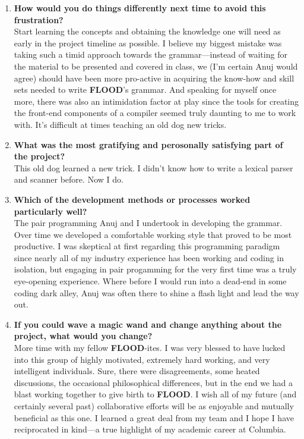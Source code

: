 \documentclass[12pt]{report}
\begin{document}
\begin{enumerate}
\item \textbf{How would you do things differently next time to avoid this frustration?}\\
Start learning the concepts and obtaining the knowledge one will need as early in the project timeline as possible. I believe my biggest mistake was taking such a timid approach towards the grammar---instead of waiting for the material to be presented and covered in class, we (I'm certain Anuj would agree) should have been more pro-active in acquiring the know-how and skill sets needed to write \textbf{FLOOD}'s grammar. And speaking for myself once more, there was also an intimidation factor at play since the tools for creating the front-end components of a compiler seemed truly daunting to me to work with. It's difficult at times teaching an old dog new tricks.
\item \textbf{What was the most gratifying and perosonally satisfying part of the project?}\\
This old dog learned a new trick. I didn't know how to write a lexical parser and scanner before. Now I do.
\item \textbf{Which of the development methods or processes worked particularly well?}\\
The pair programming Anuj and I undertook in developing the grammar. Over time we developed a comfortable working style that proved to be most productive. I was skeptical at first regarding this programming paradigm since nearly all of my industry experience has been working and coding in isolation, but engaging in pair progamming for the very first time was a truly eye-opening experience. Where before I would run into a dead-end in some coding dark alley, Anuj was often there to shine a flash light and lead the way out.
\item \textbf{If you could wave a magic wand and change anything about the project, what would you change?}\\
More time with my fellow \textbf{FLOOD}-ites. I was very blessed to have lucked into this group of highly motivated, extremely hard working, and very intelligent individuals. Sure, there were disagreements, some heated discussions, the occasional philosophical differences, but in the end we had a blast working together to give birth to \textbf{FLOOD}. I wish all of my future (and certainly several past) collaborative efforts will be as enjoyable and mutually beneficial as this one. I learned a great deal from my team and I hope I have reciprocated in kind---a true highlight of my academic career at Columbia.
\end{enumerate}
\end{document}
